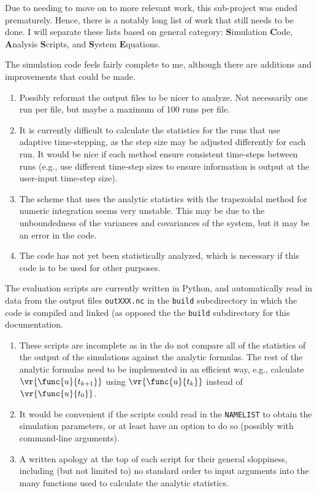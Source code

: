 Due to needing to move on to more relevant work, this sub-project was ended prematurely. Hence, there is a notably long list of work that still needs to be done. I will separate these lists based on general category: \textbf{S}imulation \textbf{C}ode, \textbf{A}nalysis \textbf{S}cripts, and \textbf{S}ystem \textbf{E}quations. 

The simulation code feels fairly complete to me, although there are additions and improvements that could be made.

\begin{enumerate}[\textbf{SC}--1)]
	\item Possibly reformat the output files to be nicer to analyze. Not necessarily one run per file, but maybe a maximum of 100 runs per file.
	\item It is currently difficult to calculate the statistics for the runs that use adaptive time-stepping, as the step size may be adjusted differently for each run. It would be nice if each method ensure consistent time-steps between runs (e.g., use different time-step sizes to ensure information is output at the user-input time-step size).
	\item The scheme that uses the analytic statistics with the trapezoidal method for numeric integration seems very unstable. This may be due to the unboundedness of the variances and covariances of the system, but it may be an error in the code.
	\item The code has not yet been statistically analyzed, which is necessary if this code is to be used for other purposes.
\end{enumerate}

The evaluation scripts are currently written in Python, and automatically read in data from the output files \texttt{outXXX.nc} in the \texttt{build} subcdirectory in which the code is compiled and linked (as opposed the the \texttt{build} subdirectory for this documentation.

\begin{enumerate}[\textbf{AS}--1)]
	\item These scripts are incomplete as in the do not compare all of the statistics of the output of the simulations against the analytic formulas. The rest of the analytic formulas need to be implemented in an efficient way, e.g., calculate $\vr{\func{u}{t_{k+1}}}$ using $\vr{\func{u}{t_{k}}}$ instead of $\vr{\func{u}{t_{0}}}$.
	\item  It would be convenient if the scripts could read in the \texttt{NAMELIST} to obtain the simulation parameters, or at least have an option to do so (possibly with command-line arguments).
	\item A written apology at the top of each script for their general sloppiness, including (but not limited to) no standard order to input arguments into the many functions used to calculate the analytic statistics.
\end{enumerate}

